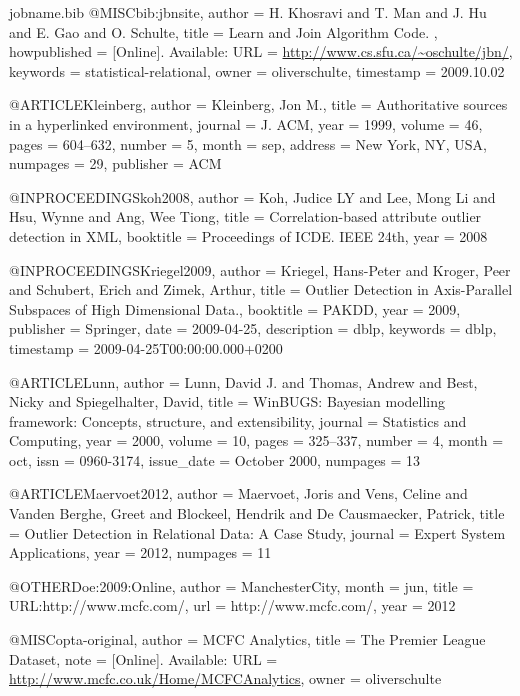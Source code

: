 {\begin{filecontents*}{jobname.bib}
	@MISC{bib:jbnsite,
		author = {H. Khosravi and T. Man and J. Hu and E. Gao and O. Schulte},
		title = {Learn and Join Algorithm Code.   },
		howpublished = {[Online]. Available: URL = \url{http://www.cs.sfu.ca/~oschulte/jbn/}},
		keywords = {statistical-relational},
		owner = {oliverschulte},
		timestamp = {2009.10.02}
	}
	
	@ARTICLE{Kleinberg,
		author = {Kleinberg, Jon M.},
		title = {Authoritative sources in a hyperlinked environment},
		journal = {J. ACM},
		year = {1999},
		volume = {46},
		pages = {604--632},
		number = {5},
		month = sep,
		address = {New York, NY, USA},
		numpages = {29},
		publisher = {ACM}
	}
	
	@INPROCEEDINGS{koh2008,
		author = {Koh, Judice LY and Lee, Mong Li and Hsu, Wynne and Ang, Wee Tiong},
		title = {Correlation-based attribute outlier detection in {XML}},
		booktitle = {Proceedings of ICDE. IEEE 24th},
		year = {2008}
	}
	
	@INPROCEEDINGS{Kriegel2009,
		author = {Kriegel, Hans-Peter and Kroger, Peer and Schubert, Erich and Zimek,
			Arthur},
		title = {Outlier Detection in Axis-Parallel Subspaces of High Dimensional
			Data.},
		booktitle = {PAKDD},
		year = {2009},
		publisher = {Springer},
		date = {2009-04-25},
		description = {dblp},
		keywords = {dblp},
		timestamp = {2009-04-25T00:00:00.000+0200}
	}
	
	@ARTICLE{Lunn,
		author = {Lunn, David J. and Thomas, Andrew and Best, Nicky and Spiegelhalter,
			David},
		title = {WinBUGS: Bayesian modelling framework: Concepts, structure, and extensibility},
		journal = {Statistics and Computing},
		year = {2000},
		volume = {10},
		pages = {325--337},
		number = {4},
		month = oct,
		issn = {0960-3174},
		issue_date = {October 2000},
		numpages = {13}
	}
	
	@ARTICLE{Maervoet2012,
		author = {Maervoet, Joris and Vens, Celine and Vanden Berghe, Greet and Blockeel,
			Hendrik and De Causmaecker, Patrick},
		title = {Outlier Detection in Relational Data: A Case Study},
		journal = {Expert System Applications},
		year = {2012},
		numpages = {11}
	}
	
	@OTHER{Doe:2009:Online,
		author = {ManchesterCity},
		month = jun,
		title = {URL:http://www.mcfc.com/},
		url = {http://www.mcfc.com/},
		year = {2012}
	}
	
	@MISC{opta-original,
		author = {{MCFC Analytics}},
		title = {The Premier League Dataset},
		note = {[Online]. Available: URL = \url{http://www.mcfc.co.uk/Home/MCFCAnalytics}},
		owner = {oliverschulte}
	}
	

\end{filecontents*}}
